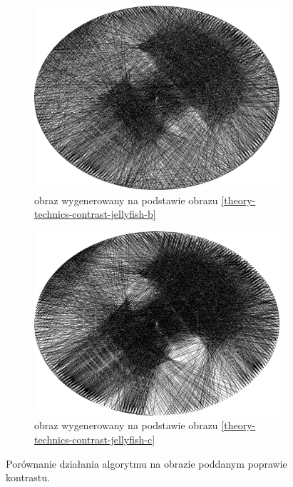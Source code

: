         \begin{figure}[htb] 
        \centering
        \begin{subfigure}{0.49\textwidth}
            \centering
            \includegraphics[width = \textwidth]{img/2-theory/10-jellyfish_b_ellipse_2000_threaded.png}
            \caption{obraz wygenerowany na podstawie obrazu \ref{theory-technics-contrast-jellyfish-b}}
            \label{theory-technics-contrast-thread-jellyfish-a}
        \end{subfigure}
        \begin{subfigure}{0.49\textwidth}
            \centering
            \includegraphics[width = \textwidth]{img/2-theory/20-jellyfish_b_ellipse_2000_threaded.png}
            \caption{obraz wygenerowany na podstawie obrazu \ref{theory-technics-contrast-jellyfish-c}}
            \label{theory-technics-contrast-thread-jellyfish-b}
        \end{subfigure}
        \caption{Porównanie działania algorytmu na obrazie poddanym poprawie kontrastu.}
        \label{theory-technics-contrast-thread-jellyfish}
        \end{figure}
        
